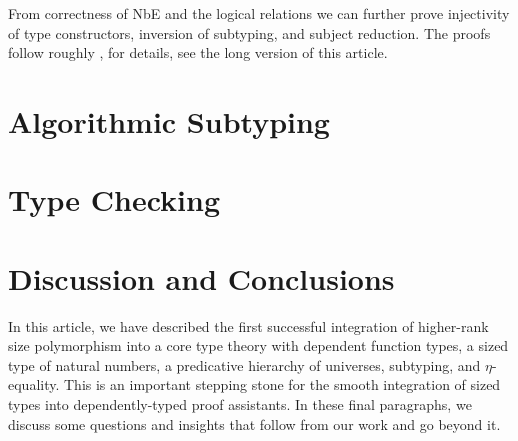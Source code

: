 \documentclass[acmsmall,screen]{acmart}\settopmatter{}
\newcommand{\LONGVERSION}[1]{}
\newcommand{\SHORTVERSION}[1]{#1}
\begin{document}
\LONGVERSION{

} %
\SHORTVERSION{
From correctness of NbE and the logical relations we can further prove
injectivity of type constructors, inversion of subtyping, and subject reduction.
The proofs follow roughly \citet{fridlenderPagano:tlca13}, for
details, see the long version of this article.
} %

\section{Algorithmic Subtyping}
\label{sec:asub}


% 


\section{Type Checking}
\label{sec:tycheck}


% 

\section{Discussion and Conclusions}
\label{sec:concl}

In this article, we have described the first successful integration of higher-rank size polymorphism into a core type theory with dependent function types, a sized type of natural numbers, a predicative hierarchy of universes, subtyping, and $\eta$-equality.  This is an important stepping stone for the smooth integration of sized types into dependently-typed proof assistants.
In these final paragraphs, we discuss some questions and insights that follow from our work and go beyond it.
\end{document}
